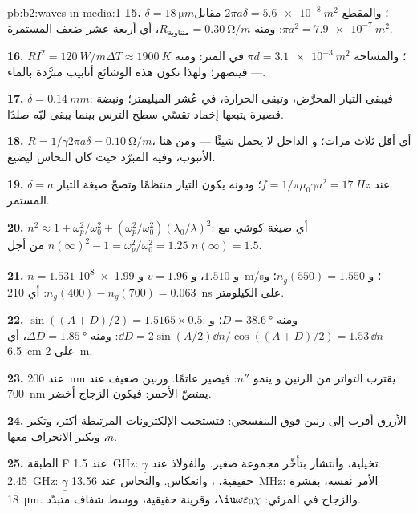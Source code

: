 \begin{solution}{pb:b2:waves-in-media:1}
\textbf{15.} $\delta = \qty{18}{\micro m}$؛ والمقطع $2\pi a\delta = \qty{5.6e-8}{m^2}$ مقابل
$\pi a^2 = \qty{7.9e-7}{m^2}$: ومنه $R_{\text{متناوبة}} = \qty{0.30}{\ohm/m}$، أي أربعة عشر ضعف المستمرة.

\textbf{16.} $RI^2 = \qty{120}{W/m}$؛ والمساحة $\pi d = \qty{3.1e-3}{m^2}$ في المتر:
ومنه $\Delta T \approx \qty{1900}{K}$ --- فينصهر؛ ولهذا تكون هذه الوشائع أنابيب مبرَّدة بالماء.

\textbf{17.} $\delta = \qty{0.14}{mm}$: فيبقى التيار المحرَّض، وتبقى الحرارة،
في عُشر الميليمتر؛ ونبضة قصيرة يتبعها إخماد تقسّي
سطح الترس بينما يبقى لبّه صلدًا.

\textbf{18.} $R = 1/\gamma2\pi a\delta = \qty{0.10}{\ohm/m}$، أي أقل ثلاث مرات؛ و
الداخل لا يحمل شيئًا --- ومن هنا الأنبوب، وفيه المبرّد حيث كان
النحاس ليضيع.

\textbf{19.} $\delta = a$ عند $f = 1/\pi\mu_0\gamma a^2 = \qty{17}{Hz}$؛ ودونه يكون التيار
منتظمًا وتصحّ صيغة التيار المستمر.

\textbf{20.} $n^2 \approx 1 + \omega_p^2/\omega_0^2 + (\omega_p^2/\omega_0^2)(\lambda_0/\lambda)^2$: أي صيغة كوشي
مع $n(\infty)^2 - 1 = \omega_p^2/\omega_0^2 = 1.25$ من أجل $n(\infty) = 1.5$.

\textbf{21.} $n = 1.531$ و $1.510$، و $v = 1.96$ و \qty{1.99e8}{m/s}؛ و $n_g(550) =
1.550$؛ و $n_g(400) - n_g(700) = 0.063$: أي \qty{210}{ns} على الكيلومتر.

\textbf{22.} $\sin((A + D)/2) = 1.5165 \times 0.5$: ومنه $D = \qty{38.6}{\degree}$؛ و $\dd D = 2\sin
(A/2)\dd n/\cos((A + D)/2) = 1.53\,\dd n$: ومنه $\Delta D = \qty{1.85}{\degree}$، أي \qty{6.5}{cm} على \qty{2}{m}.

\textbf{23.} عند \qty{200}{nm} يقترب التواتر من الرنين و
ينمو $n''$: فيصير عاتمًا. ورنين ضعيف عند \qty{700}{nm} يمتصّ الأحمر:
فيكون الزجاج أخضر.

\textbf{24.} الأزرق أقرب إلى رنين فوق البنفسجي: فتستجيب الإلكترونات
المرتبطة أكثر، وتكبر $n$، ويكبر الانحراف معها.

\textbf{25.} الطبقة F عند \qty{1.5}{GHz}: $\underline\gamma$ تخيلية، وانتشار
بتأخّر مجموعة صغير. والفولاذ عند \qty{2.45}{GHz}: $\underline\gamma$ حقيقية، ، وانعكاس. والنحاس عند \qty{13.56}{MHz}: الأمر نفسه، بقشرة
\qty{18}{\micro m}. والزجاج في المرئي: $\iu\omega\varepsilon_0\chi$، وقرينة حقيقية، ووسط
شفاف متبدّد.
\end{solution}
